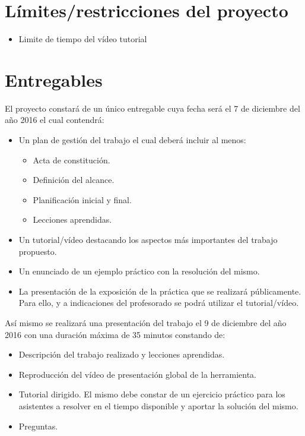 \documentclass[a4paper,10pt]{scrartcl}
\begin{document}
\section{Límites/restricciones del proyecto}

\begin{itemize}
	\item Limite de tiempo del vídeo tutorial
\end{itemize}

\section{Entregables}

El proyecto constará de un único entregable cuya fecha será el 7 de diciembre del año 2016 el cual contendrá:
	\begin{itemize}
		\item Un plan de gestión del trabajo el cual deberá incluir al menos:
		
		\begin{itemize}
			\item Acta de constitución.
			\item Definición del alcance.
			\item Planificación inicial y final.
			\item Lecciones aprendidas.
		\end{itemize}
		
		\item Un tutorial/vídeo destacando los aspectos más importantes del trabajo propuesto.
		
		\item Un enunciado de un ejemplo práctico con la resolución del mismo.
		
		\item La presentación de la exposición de la práctica que se realizará públicamente. Para ello, y a indicaciones del profesorado se podrá utilizar el tutorial/vídeo.		
	\end{itemize}

Así mismo se realizará una presentación del trabajo el 9 de diciembre del año 2016 con una duración máxima de 35 minutos constando de:
\begin{itemize}
	\item Descripción del trabajo realizado y lecciones aprendidas.
	
	\item Reproducción del vídeo de presentación global de la herramienta.
	
	\item Tutorial dirigido. El mismo debe constar de un ejercicio práctico para los asistentes a resolver en el tiempo disponible y aportar la solución del mismo.

	\item Preguntas.


\end{itemize}
\end{document}
